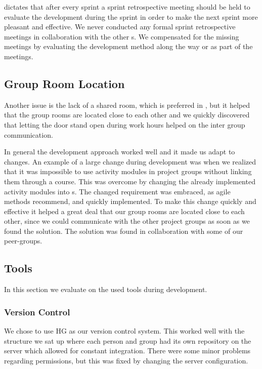 \scrum{} dictates that after every sprint a sprint retrospective meeting should be held to evaluate the development during the sprint in order to make the next sprint more pleasant and effective.
We never conducted any formal sprint retrospective meetings in collaboration with the other \subgroup{}s.
We compensated for the missing meetings by evaluating the development method along the way or as part of the \sos{} meetings. 





\subsection{Group Room Location}
Another issue is the lack of a shared room, which is preferred in \sos{}, but it helped that the group rooms are located close to each other and we quickly discovered that letting the door stand open during work hours helped on the inter group communication. 

In general the development approach worked well and it made us adapt to changes. 
An example of a large change during development was when we realized that it was impossible to use activity modules in project groups without linking them through a course.
This was overcome by changing the already implemented activity modules into \block[]s. 
The changed requirement was embraced, as agile methods recommend, and quickly implemented.
To make this change quickly and effective it helped a great deal that our group rooms are located close to each other, since we could communicate with the other project groups as soon as we found the solution.
The solution was found in collaboration with some of our peer-groups.



\subsection{Tools}
In this section we evaluate on the used tools during development. 

\subsubsection{Version Control}
We chose to use HG as our version control system. 
This worked well with the structure we sat up where each person and group had its own repository on the server which allowed for constant integration. 
There were some minor problems regarding permissions, but this was fixed by changing the server configuration. 


